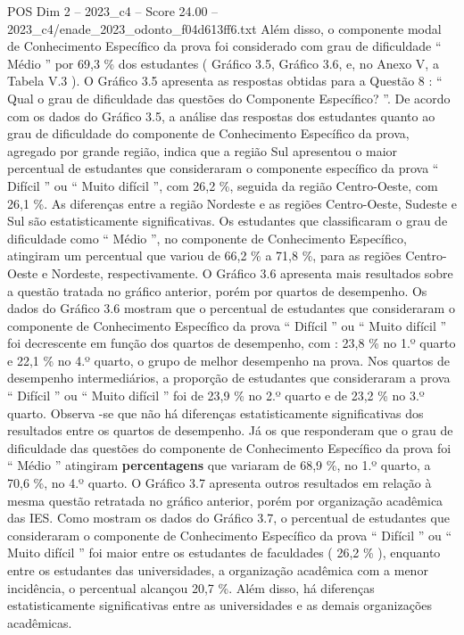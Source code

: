 \begin{textsample}{POS Dim 2 – 2023\_c4 – Score 24.00 – 2023\_c4/enade\_2023\_odonto\_f04d613ff6.txt}
Além disso, o componente modal de Conhecimento Específico da prova foi considerado com grau de dificuldade “ Médio ” por 69,3 \% dos estudantes ( Gráfico 3.5, Gráfico 3.6, e, no Anexo V, a Tabela V.3 ).
O Gráfico 3.5 apresenta as respostas obtidas para a Questão 8 : “ Qual o grau de dificuldade das questões do Componente Específico? ”.
De acordo com os dados do Gráfico 3.5, a análise das respostas dos estudantes quanto ao grau de dificuldade do componente de Conhecimento Específico da prova, agregado por grande região, indica que a região Sul apresentou o maior percentual de estudantes que consideraram o componente específico da prova “ Difícil ” ou “ Muito difícil ”, com 26,2 \%, seguida da região Centro-Oeste, com 26,1 \%.
As diferenças entre a região Nordeste e as regiões Centro-Oeste, Sudeste e Sul são estatisticamente significativas.
Os estudantes que classificaram o grau de dificuldade como “ Médio ”, no componente de Conhecimento Específico, atingiram um percentual que variou de 66,2 \% a 71,8 \%, para as regiões Centro-Oeste e Nordeste, respectivamente.
O Gráfico 3.6 apresenta mais resultados sobre a questão tratada no gráfico anterior, porém por quartos de desempenho.
Os dados do Gráfico 3.6 mostram que o percentual de estudantes que consideraram o componente de Conhecimento Específico da prova “ Difícil ” ou “ Muito difícil ” foi decrescente em função dos quartos de desempenho, com : 23,8 \% no 1.º quarto e 22,1 \% no 4.º quarto, o grupo de melhor desempenho na prova.
Nos quartos de desempenho intermediários, a proporção de estudantes que consideraram a prova “ Difícil ” ou “ Muito difícil ” foi de 23,9 \% no 2.º quarto e de 23,2 \% no 3.º quarto.
Observa -se que não há diferenças estatisticamente significativas dos resultados entre os quartos de desempenho.
Já os que responderam que o grau de dificuldade das questões do componente de Conhecimento Específico da prova foi “ Médio ” atingiram \textbf{percentagens} que variaram de 68,9 \%, no 1.º quarto, a 70,6 \%, no 4.º quarto.
O Gráfico 3.7 apresenta outros resultados em relação à mesma questão retratada no gráfico anterior, porém por organização acadêmica das IES.
Como mostram os dados do Gráfico 3.7, o percentual de estudantes que consideraram o componente de Conhecimento Específico da prova “ Difícil ” ou “ Muito difícil ” foi maior entre os estudantes de faculdades ( 26,2 \% ), enquanto entre os estudantes das universidades, a organização acadêmica com a menor incidência, o percentual alcançou 20,7 \%.
Além disso, há diferenças estatisticamente significativas entre as universidades e as demais organizações acadêmicas.

\end{textsample}
